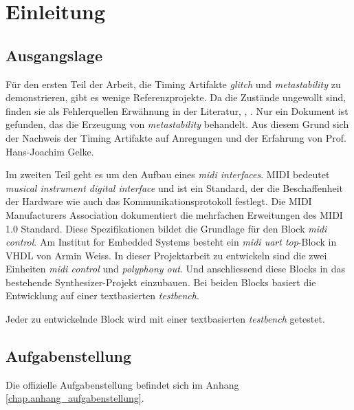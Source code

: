 
\chapter{Einleitung}\label{chap.einleitung}


\section{Ausgangslage}\label{sect.einleitung_ausgangslage}
Für den ersten Teil der Arbeit, die Timing Artifakte  \textit{glitch} und \textit{metastability} zu demonstrieren, gibt es wenige Referenzprojekte. Da die Zustände ungewollt sind, finden sie als Fehlerquellen Erwähnung in der Literatur\cite{ReferenceManual},  \cite{F_glitches}, \cite{F_metastability}. Nur ein Dokument ist gefunden, das die Erzeugung von \textit{ metastability} behandelt\cite{Metastabil}. Aus diesem Grund sich der Nachweis der Timing Artifakte auf Anregungen und der Erfahrung von Prof. Hans-Joachim Gelke.


Im zweiten Teil geht es um den Aufbau eines \textit{midi interfaces}. MIDI bedeutet \textit{musical instrument digital interface} und ist ein Standard, der die Beschaffenheit der Hardware wie auch das Kommunikationsprotokoll festlegt\cite{Midi_Braut}. Die MIDI Manufacturers Association dokumentiert die mehrfachen Erweitungen des MIDI 1.0 Standard\cite{Midi_specification}. Diese Spezifikationen bildet die Grundlage für den Block \textit{midi control}. Am Institut for Embedded Systems besteht ein \textit{midi uart top}-Block in VHDL von Armin Weiss. In dieser Projektarbeit zu entwickeln sind die zwei Einheiten \textit{midi control}  und \textit{polyphony out}. Und anschliessend diese Blocks in das bestehende Synthesizer-Projekt einzubauen. Bei beiden Blocks basiert die Entwicklung auf einer textbasierten \textit{testbench}.


Jeder zu entwickelnde Block wird mit einer textbasierten \textit{testbench} getestet. 

\section{Aufgabenstellung}\label{sect.einleitung_ziele}
Die offizielle Aufgabenstellung befindet sich im Anhang \ref{chap.anhang_aufgabenstellung}. 

